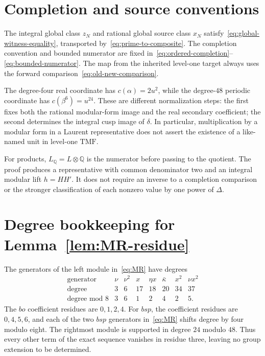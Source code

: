 \documentclass[11pt,a4paper]{amsart}
\newcommand{\Q}{\mathbb Q}
\newcommand{\TMF}{\mathrm{TMF}}
\theoremstyle{plain}
\theoremstyle{definition}
\theoremstyle{remark}
\begin{document}
\appendix
\section{Completion and source conventions}\label{app:interfaces}

The integral global class $z_N$ and rational global source class $x_N$
satisfy~\eqref{eq:global-witness-equality}, transported
by~\eqref{eq:prime-to-composite}. The completion convention and
bounded numerator are fixed
in~\eqref{eq:ordered-completion}--\eqref{eq:bounded-numerator}.
The map from the inherited level-one target always uses the forward
comparison~\eqref{eq:old-new-comparison}.

The degree-four real coordinate has
$c(\alpha)=2u^2$, while the degree-$48$ periodic coordinate has
$c(\beta^6)=u^{24}$. These are different normalization steps:
the first fixes both the rational modular-form image and the real
secondary coefficient; the second determines the integral cusp
image of $\delta$. In particular, multiplication by a modular
form in a Laurent representative does not assert the existence of
a like-named unit in level-one $\TMF$.

For products, $L_\Q=L\otimes\Q$ is the numerator before passing
to the quotient. The proof produces a representative with common
denominator two and an integral modular lift $h=HH'$.
It does not require an inverse to a completion comparison or the
stronger classification of each nonzero value by one power of
$\Delta$.

\section{Degree bookkeeping for Lemma~\ref{lem:MR-residue}}

The generators of the left module in~\eqref{eq:MR} have degrees
\[
\begin{array}{c|ccccccc}
\text{generator}&\nu&\nu^2&x&\eta x&\bar\kappa&x^2&\nu x^2\\
\hline
\text{degree}&3&6&17&18&20&34&37\\
\text{degree mod }8&3&6&1&2&4&2&5.
\end{array}
\]
The $bo$ coefficient residues are $0,1,2,4$. For $bsp$, the
coefficient residues are $0,4,5,6$, and each of the two $bsp$
generators in~\eqref{eq:MR} shifts degree by four modulo eight.
The rightmost module is supported in degree $24$ modulo $48$.
Thus every other term of the exact sequence vanishes in residue
three, leaving no group extension to be determined.
\end{document}
